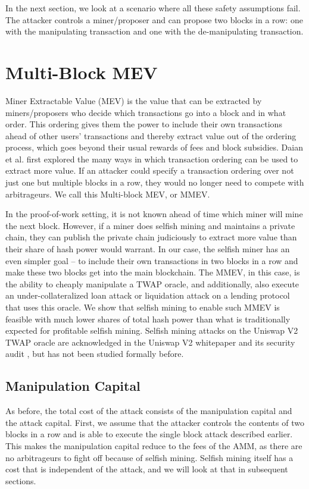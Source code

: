 In the next section, we look at a scenario where all these safety assumptions fail. The attacker controls a miner/proposer and can propose two blocks in a row: one with the manipulating transaction and one with the de-manipulating transaction. 

\section{Multi-Block MEV}
Miner Extractable Value (MEV) is the value that can be extracted by miners/proposers who decide which transactions go into a block and in what order. This ordering gives them the power to include their own transactions ahead of other users' transactions and thereby extract value out of the ordering process, which goes beyond their usual rewards of fees and block subsidies. Daian et al. \cite{daian2019flashboys} first explored the many ways in which transaction ordering can be used to extract more value. If an attacker could specify a transaction ordering over not just one but multiple blocks in a row, they would no longer need to compete with arbitrageurs. We call this Multi-block MEV, or MMEV. 

In the proof-of-work setting, it is not known ahead of time which miner will mine the next block. However, if a miner does selfish mining \cite{eyal2014majority,sapirshtein2016optimal,Ritz_2018} and maintains a private chain, they can publish the private chain judiciously to extract more value than their share of hash power would warrant. In our case, the selfish miner has an even simpler goal -- to include their own transactions in two blocks in a row and make these two blocks get into the main blockchain. The MMEV, in this case, is the ability to cheaply manipulate a TWAP oracle, and additionally, also execute an under-collateralized loan attack or liquidation attack on a lending protocol that uses this oracle. We show that selfish mining to enable such MMEV is feasible with much lower shares of total hash power than what is traditionally expected for profitable selfish mining. Selfish mining attacks on the Uniswap V2 TWAP oracle are acknowledged in the Uniswap V2 whitepaper \cite{Adams2020UniV2} and its security audit \cite{UniswapAudit}, but has not been studied formally before.

\subsection{Manipulation Capital}
As before, the total cost of the attack consists of the manipulation capital and the attack capital. First, we assume that the attacker controls the contents of two blocks in a row and is able to execute the single block attack described earlier. This makes the manipulation capital reduce to the fees of the AMM, as there are no arbitrageurs to fight off because of selfish mining. Selfish mining itself has a cost that is independent of the attack, and we will look at that in subsequent sections.

